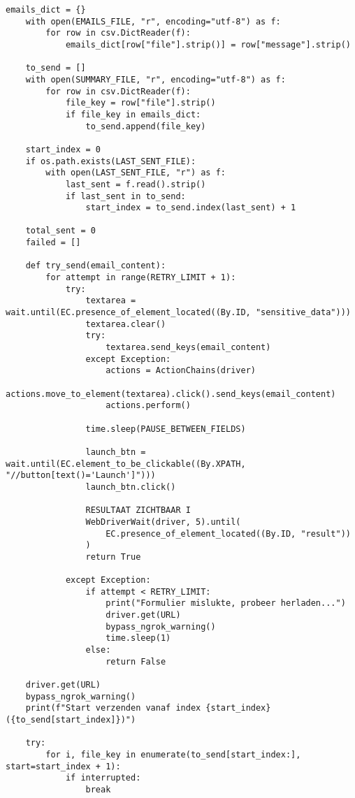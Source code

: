 \begin{lstlisting}[style=custompython,caption={Selenium WebDriver script voor automatisering van gegevensverwerking},label={lst:send-request}]
    emails_dict = {}
    with open(EMAILS_FILE, "r", encoding="utf-8") as f:
        for row in csv.DictReader(f):
            emails_dict[row["file"].strip()] = row["message"].strip()

    to_send = []
    with open(SUMMARY_FILE, "r", encoding="utf-8") as f:
        for row in csv.DictReader(f):
            file_key = row["file"].strip()
            if file_key in emails_dict:
                to_send.append(file_key)

    start_index = 0
    if os.path.exists(LAST_SENT_FILE):
        with open(LAST_SENT_FILE, "r") as f:
            last_sent = f.read().strip()
            if last_sent in to_send:
                start_index = to_send.index(last_sent) + 1

    total_sent = 0
    failed = []

    def try_send(email_content):
        for attempt in range(RETRY_LIMIT + 1):
            try:
                textarea = wait.until(EC.presence_of_element_located((By.ID, "sensitive_data")))
                textarea.clear()
                try:
                    textarea.send_keys(email_content)
                except Exception:
                    actions = ActionChains(driver)
                    actions.move_to_element(textarea).click().send_keys(email_content)
                    actions.perform()

                time.sleep(PAUSE_BETWEEN_FIELDS)

                launch_btn = wait.until(EC.element_to_be_clickable((By.XPATH, "//button[text()='Launch']")))
                launch_btn.click()

                RESULTAAT ZICHTBAAR I
                WebDriverWait(driver, 5).until(
                    EC.presence_of_element_located((By.ID, "result"))
                )
                return True

            except Exception:
                if attempt < RETRY_LIMIT:
                    print("Formulier mislukte, probeer herladen...")
                    driver.get(URL)
                    bypass_ngrok_warning()
                    time.sleep(1)
                else:
                    return False

    driver.get(URL)
    bypass_ngrok_warning()
    print(f"Start verzenden vanaf index {start_index} ({to_send[start_index]})")

    try:
        for i, file_key in enumerate(to_send[start_index:], start=start_index + 1):
            if interrupted:
                break


\end{lstlisting}
